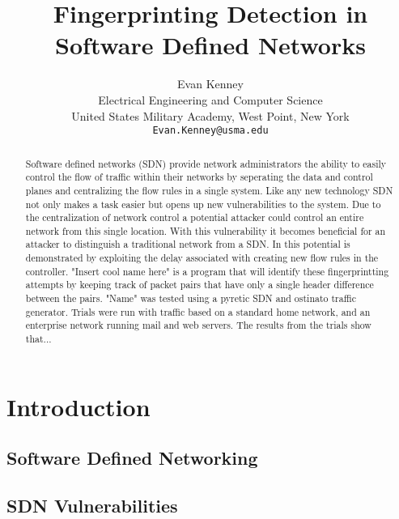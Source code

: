 \documentclass[twocolumn]{article}
\begin{document}
\title{Fingerprinting Detection in Software Defined Networks}
\author{Evan Kenney\\
	Electrical Engineering and Computer Science\\
	United States Military Academy, West Point, New York\\
	\texttt{Evan.Kenney@usma.edu}}
\maketitle

\begin{abstract}

Software defined networks (SDN) provide network administrators the ability to easily control the flow of traffic within their networks by seperating the data and control planes and centralizing the flow rules in a single system. Like any new technology SDN not only makes a task easier but opens up new vulnerabilities to the system. Due to the centralization of network control a potential attacker could control an entire network from this single location. With this vulnerability it becomes beneficial for an attacker to distinguish a traditional network from a SDN. In \cite{Gu13} this potential is demonstrated by exploiting the delay associated with creating new flow rules in the controller. "Insert cool name here" is a program that will identify these fingerprintting attempts by keeping track of packet pairs that have only a single header difference between the pairs. "Name" was tested using a pyretic SDN and ostinato traffic generator. Trials were run with traffic based on a standard home network, and an enterprise network running mail and web servers. The results from the trials show that...

\end{abstract}

\section{Introduction}

\subsection{Software Defined Networking}



\subsection{SDN Vulnerabilities}
\end{document}

